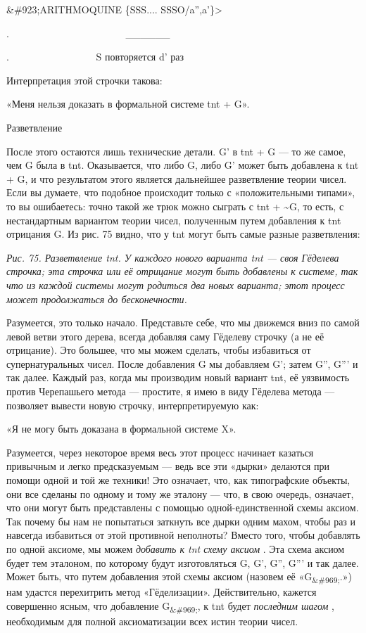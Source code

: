\documentclass[../main.tex]{subfiles}
\begin{document}
\&\#923;ARITHMOQUINE \{SSS.... SSSO/a'',a'\}\textgreater{}

.~~~~~~~~~~~~~~~~~~~~~~~ \textbar\_\_\_\_\_\_\textbar{}

.~~~~~~~~~~~~~~~~~ S повторяется d' раз

Интерпретация этой строчки такова:

«Меня нельзя доказать в формальной системе \acs{tnt} + G».

Разветвление

После этого остаются лишь технические детали. G' в \acs{tnt} + G --- то же самое, чем G была в \acs{tnt}\@. Оказывается, что либо G, либо G' может быть добавлена к \acs{tnt} + G, и что результатом этого является дальнейшее разветвление теории чисел. Если вы думаете, что подобное происходит только с «положительными типами», то вы ошибаетесь: точно такой же трюк можно сыграть с \acs{tnt} + \textasciitilde G, то есть, с нестандартным вариантом теории чисел, полученным путем добавления к \acs{tnt} отрицания G. Из рис. 75 видно, что у \acs{tnt} могут быть самые разные разветвления:

\emph{Рис. 75. Разветвление \acs{tnt}\@. У каждого нового варианта \acs{tnt} --- своя Гёделева строчка; эта строчка или её отрицание могут быть добавлены к системе, так что из каждой системы могут родиться два новых варианта; этот процесс может продолжаться до бесконечности.}

Разумеется, это только начало. Представьте себе, что мы движемся вниз по самой левой ветви этого дерева, всегда добавляя саму Гёделеву строчку (а не её отрицание). Это большее, что мы можем сделать, чтобы избавиться от супернатуральных чисел. После добавления G мы добавляем G'; затем G'', G''' и так далее. Каждый раз, когда мы производим новый вариант \acs{tnt}, её уязвимость против Черепашьего метода --- простите, я имею в виду Гёделева метода --- позволяет вывести новую строчку, интерпретируемую как:

«Я не могу быть доказана в формальной системе X».

Разумеется, через некоторое время весь этот процесс начинает казаться привычным и легко предсказуемым --- ведь все эти «дырки» делаются при помощи одной и той же техники! Это означает, что, как типографские объекты, они все сделаны по одному и тому же эталону --- что, в свою очередь, означает, что они могут быть представлены с помощью одной-единственной схемы аксиом. Так почему бы нам не попытаться заткнуть все дырки одним махом, чтобы раз и навсегда избавиться от этой противной неполноты? Вместо того, чтобы добавлять по одной аксиоме, мы можем \emph{добавить к \acs{tnt} схему аксиом} . Эта схема аксиом будет тем эталоном, по которому будут изготовляться G, G', G'', G''' и так далее. Может быть, что путем добавления этой схемы аксиом (назовем её «G\textsubscript{\&\#969;}.») нам удастся перехитрить метод «Гёделизации». Действительно, кажется совершенно ясным, что добавление G\textsubscript{\&\#969;}, к \acs{tnt} будет \emph{последним шагом} , необходимым для полной аксиоматизации всех истин теории чисел.
\end{document}
